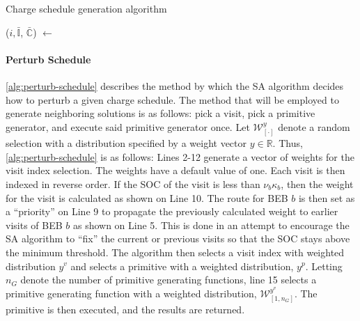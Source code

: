 \documentclass[energies,article,submit,moreauthors]{Definitions/mdpi}
\newcommand{\I}{\mathbb{I}}                 %
\newcommand{\C}{\mathbb{C}}                 %
\newcommand{\W}{\mathcal{W}}                %
\begin{document}
\begin{algorithm}[H]
\scriptsize
\caption{Charge schedule generation algorithm} \label{alg:charge-schedule-generation}
    \LinesNumbered
    \KwIn{$(\I, \C)$}
    \KwOut{$(\bar{\I}, \bar{\C})$}


    \Begin
    {
        \ForEach {$\I_i \in \I$}
        {
            ($i, \bar{\I}$, $\bar{\C}$) $\leftarrow$ \NewVisit{($\I_i$, $\I$, $\C$)}
        }
            \Return{($\bar{\I}$, $\bar{\C}$)}
    }
  \end{algorithm}

\paragraph{Perturb Schedule}
\label{sec:sa-tweak-schedule}
\ref{alg:perturb-schedule} describes the method by which the SA algorithm decides how to perturb a given charge
schedule. The method that will be employed to generate neighboring solutions is as follows: pick a visit, pick a
primitive generator, and execute said primitive generator once. Let \(\W^y_{[\cdot]}\) denote a random selection with a
distribution specified by a weight vector \(y \in \mathbb{R}\). Thus, \ref{alg:perturb-schedule} is as follows: Lines 2-12 generate a
vector of weights for the visit index selection. The weights have a default value of one. Each visit is then indexed in
reverse order. If the SOC of the visit is less than \(\nu_b \kappa_b\), then the weight for the visit is calculated as shown on
Line 10. The route for BEB \(b\) is then set as a ``priority'' on Line 9 to propagate the previously calculated weight to
earlier visits of BEB \(b\) as shown on Line 5. This is done in an attempt to encourage the SA algorithm to ``fix'' the
current or previous visits so that the SOC stays above the minimum threshold. The algorithm then selects a visit index
with weighted distribution \(y^v\) and selects a primitive with a weighted distribution, \(y^p\). Letting \(n_G\) denote the
number of primitive generating functions, line 15 selects a primitive generating function with a weighted distribution,
\(\W^{y^v}_{[1, n_G]}\). The primitive is then executed, and the results are returned.
\end{document}

